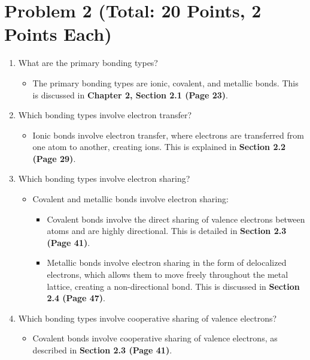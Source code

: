\documentclass{article}
\begin{document}
\section*{Problem 2 (Total: 20 Points, 2 Points Each)}
\begin{enumerate}
	\item[(a)] What are the primary bonding types?
	      \begin{itemize}
	      	\item The primary bonding types are ionic, covalent, and metallic bonds. This is discussed in \textbf{Chapter 2, Section 2.1 (Page 23)}.
	      \end{itemize}
	      
	\item[(b)] Which bonding types involve electron transfer?
	      \begin{itemize}
	      	\item Ionic bonds involve electron transfer, where electrons are transferred from one atom to another, creating ions. This is explained in \textbf{Section 2.2 (Page 29)}.
	      \end{itemize}
	      
	\item[(c)] Which bonding types involve electron sharing?
	      \begin{itemize}
	      	\item Covalent and metallic bonds involve electron sharing:
	      	      \begin{itemize}
	      	      	\item Covalent bonds involve the direct sharing of valence electrons between atoms and are highly directional. This is detailed in \textbf{Section 2.3 (Page 41)}.
	      	      	\item Metallic bonds involve electron sharing in the form of delocalized electrons, which allows them to move freely throughout the metal lattice, creating a non-directional bond. This is discussed in \textbf{Section 2.4 (Page 47)}.
	      	      \end{itemize}
	      \end{itemize}
	      
	\item[(d)] Which bonding types involve cooperative sharing of valence electrons?
	      \begin{itemize}
	      	\item Covalent bonds involve cooperative sharing of valence electrons, as described in \textbf{Section 2.3 (Page 41)}.
	      \end{itemize}
	      

\end{enumerate}
\end{document}
